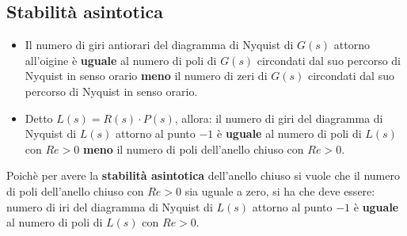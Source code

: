 \begin{landscape}
\begin{multicols*}{2}
    \subsection{Stabilità asintotica}
    \begin{itemize}
        \item Il numero di giri antiorari del diagramma di Nyquist di $G(s)$ attorno all'oigine è \textbf{uguale} al numero di poli di $G(s)$ circondati dal suo percorso di Nyquist in senso orario \textbf{meno} il numero di zeri di $G(s)$ circondati dal suo percorso di Nyquist in senso orario.
        \item Detto $L(s) = R(s) \cdot P(s)$, allora:\newline
        il numero di giri del diagramma di Nyquist di $L(s)$ attorno al punto $-1$ è \textbf{uguale} al numero di poli di $L(s)$ con $Re> 0$ \textbf{meno} il numero di poli dell'anello chiuso con $Re > 0$.
    \end{itemize}
    Poichè per avere la \textbf{stabilità asintotica} dell'anello chiuso si vuole che il numero di poli dell'anello chiuso con $Re > 0$ sia uguale a zero, si ha che deve essere:\newline
    numero di iri del diagramma di Nyquist di $L(s)$ attorno al punto $-1$ è \textbf{uguale} al numero di poli di $L(s)$ con $Re > 0$.

\end{multicols*}
\end{landscape}

